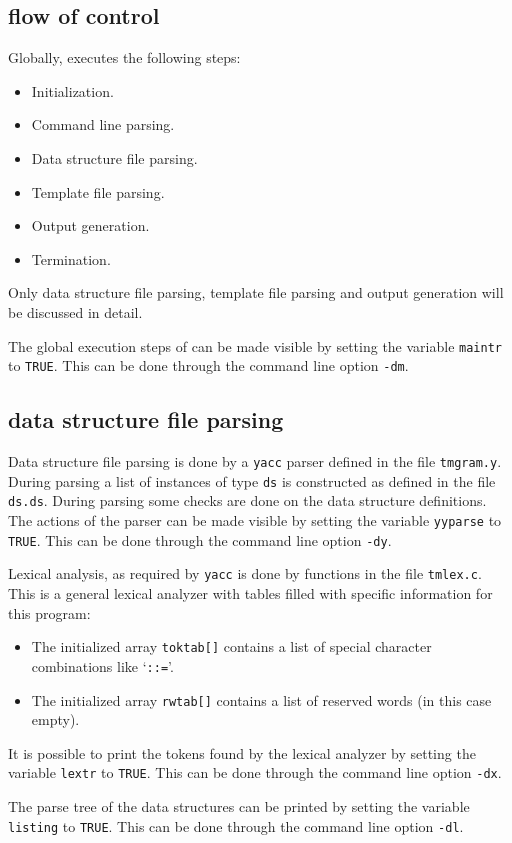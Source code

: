 \subsection{flow of control}
Globally, {\Tm} executes the following steps:
\begin{itemize}
\item Initialization.
\item Command line parsing.
\item Data structure file parsing.
\item Template file parsing.
\item Output generation.
\item Termination.
\end{itemize}
Only data structure file parsing, template file parsing and output
generation will be discussed in detail.
\par
The global execution steps of {\Tm} can be made visible by setting
the variable {\tt maintr} to {\tt TRUE}.
This can be done through the command line option {\tt -dm}.
\subsection{data structure file parsing}
Data structure file parsing is done by a {\tt yacc} parser defined in
the file {\tt tmgram.y}.
During parsing a list of instances of type {\tt ds} is constructed as
defined in the file {\tt ds.ds}.
During parsing some checks are done on the data structure definitions.
The actions of the parser can be made visible by
setting the variable {\tt yyparse} to {\tt TRUE}.
This can be done through the command line option {\tt -dy}.
\par
Lexical analysis, as required by {\tt yacc} is done by functions in the file
{\tt tmlex.c}.
This is a general lexical analyzer with tables filled with specific
information for this program:
\begin{itemize}
\item The initialized array {\tt toktab[]} contains a list of special
character combinations like `\verb!::=!'.
\item The initialized array {\tt rwtab[]} contains a list of reserved words
      (in this case empty).
\end{itemize}
It is possible to print the tokens found by
the lexical analyzer by setting the variable {\tt lextr} to {\tt TRUE}.
This can be done through the command line option {\tt -dx}.
\par
The parse tree of the data structures can be printed by setting the
variable {\tt listing} to {\tt TRUE}.
This can be done through the command line option {\tt -dl}.
